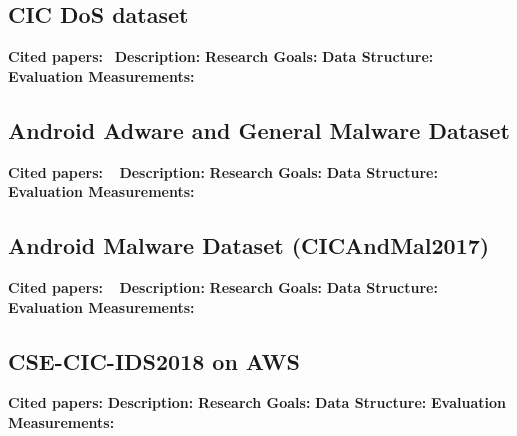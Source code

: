 \subsection{CIC DoS dataset}
\textbf{Cited papers:}~\cite{jazi2017detecting} \newline
\textbf{Description:} \newline
\textbf{Research Goals:}  \newline
\textbf{Data Structure:} \newline
\textbf{Evaluation Measurements:} \newline





\subsection{Android Adware and General Malware Dataset}
\textbf{Cited papers:} ~\cite{lashkari2017towards}\newline
\textbf{Description:} \newline
\textbf{Research Goals:}  \newline
\textbf{Data Structure:} \newline
\textbf{Evaluation Measurements:} \newline










\subsection{Android Malware Dataset (CICAndMal2017)}
\textbf{Cited papers:} ~\cite{shiravi2012toward}\newline
\textbf{Description:} \newline
\textbf{Research Goals:}  \newline
\textbf{Data Structure:} \newline
\textbf{Evaluation Measurements:} \newline

\subsection{CSE-CIC-IDS2018 on AWS}
\textbf{Cited papers:} \newline
\textbf{Description:} \newline
\textbf{Research Goals:}  \newline
\textbf{Data Structure:} \newline
\textbf{Evaluation Measurements:} \newline

